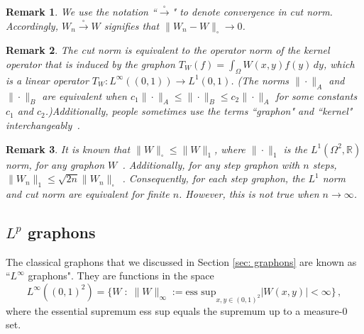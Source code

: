 \documentclass[11pt]{amsart}
\newtheorem{remark}{Remark}[section]
\def\R{\mathbb{R}}
\def\ra{\rightarrow}
\def\sqra{\stackrel{\square}{\longrightarrow}}
\numberwithin{equation}{section}
\begin{document}
\begin{remark}
    We use the notation ``$\sqra$" to denote convergence in cut norm. Accordingly, $W_n \sqra W$ {signifies}
    that $\|W_n - W\|_\square \ra 0$. 
\end{remark}


\begin{remark}
    The cut norm is equivalent to the operator norm of the kernel operator that is induced by the graphon $T_W(f) = \int_\Omega W(x,y) f(y) \, dy$, which is a linear operator $T_W: L^\infty((0,1)) \ra L^1(0,1)$. 
    (The norms $\|\cdot\|_A$ and $\|\cdot\|_B$ 
    are equivalent when
    $c_1 \|\cdot\|_A \leq \|\cdot \|_B \leq c_2 \|\cdot\|_A$ for some constants {$c_1$ and $c_2$}.)Additionally, people sometimes use the terms ``graphon" and ``kernel" interchangeably~\cite{janson2010graphons}.
\end{remark}

\begin{remark}
    {It is known that $\|W\|_\square \leq \|W\|_1$, where $\|\cdot\|_1$ is the $L^1(\Omega^2,\R)$ norm, for any graphon $W$~\cite{janson2010graphons}.} Additionally, for any step graphon with $n$ steps, $\|W_n\|_1 \leq \sqrt{2n} \|W_n\|_\square$~\cite[Equation 8.15]{lovasz2012large}.     Consequently, for each step graphon, the $L^1$ norm and cut norm are equivalent for finite $n$. However, this is not true when $n \ra \infty$. 
\end{remark}


\subsection{\texorpdfstring{$L^p$ graphons}{Lp graphons}}\label{sec: lp graphons}

The classical graphons that we discussed in Section \ref{sec: graphons} are known as ``$L^\infty$ graphons". They are functions in the space
\begin{equation}
	L^\infty((0,1)^2) = \{ W\;:\; { \|W\|_\infty := \text{ess sup}}_{x,y\in (0,1)^2} |W(x,y)| < \infty\} \,,
\end{equation}
where the essential supremum ess sup equals the supremum up to a measure-0 set. 
\end{document}
